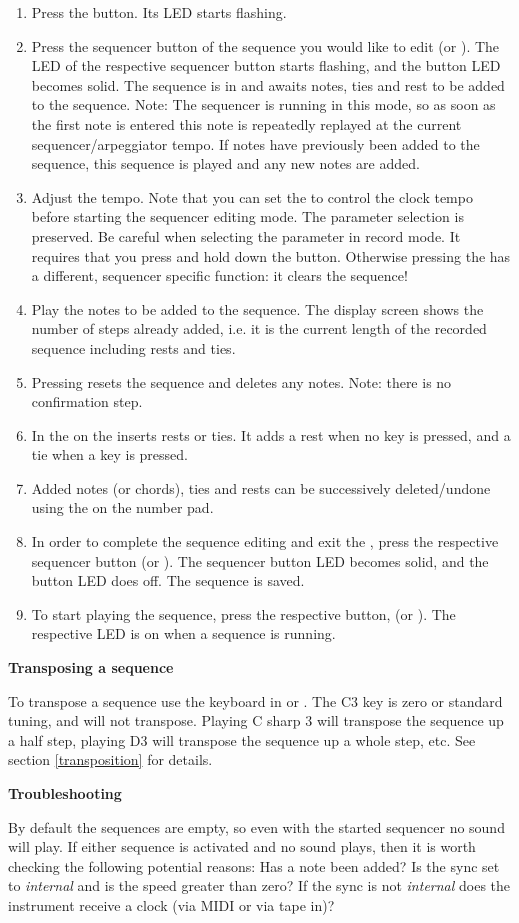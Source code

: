 \begin{enumerate}
  \item Press the \record button. Its LED starts flashing.
  \item Press the sequencer button of the sequence you would like to edit (\seqone or \seqtwo). The LED of the respective sequencer button starts flashing, and the \record button LED becomes solid. The sequence is in \seqedit and awaits notes, ties and rest to be added to the sequence. Note: The sequencer is running in this mode, so as soon as the first note is entered this note is repeatedly replayed at the current sequencer/arpeggiator tempo. If notes have previously been added to the sequence, this sequence is played and any new notes are added. 
  \item Adjust the tempo. Note that you can set the \datadial to control the clock tempo before starting the sequencer editing mode. The parameter selection is preserved. Be careful when selecting the parameter in record mode. It requires that you press and hold down the \totape button. Otherwise pressing the  has a different, sequencer specific function: it clears the sequence!  
  \item Play the notes to be added to the sequence. The display screen shows the number of steps already added, i.e. it is the current length of the recorded sequence including rests and ties.
  \item Pressing  resets the sequence and deletes any notes. Note: there is no confirmation step. 
  \item In \seqedit the  on the \termnumberpad inserts rests or ties. It adds a rest when no key is pressed, and a tie when a key is pressed.
  \item Added notes (or chords), ties and rests can be successively deleted/undone using the  on the number pad. 
  \item In order to complete the sequence editing and exit the \seqedit, press the respective sequencer button (\seqone or \seqtwo). The sequencer button LED becomes solid, and the \record button LED does off. The sequence is saved. 
  \item To start playing the sequence, press the respective button, (\seqone or \seqtwo). The respective LED is on when a sequence is running.
\end{enumerate}

\textbf{Transposing a  sequence}

To transpose a sequence use the keyboard in \shiftmode or \shiftlock. The C3 key is zero or standard tuning, and will not transpose. Playing C sharp 3 will transpose the sequence up a half step, playing D3 will transpose the sequence up a whole step, etc. See section \ref{transposition} for details.

\textbf{Troubleshooting}

By default the sequences are empty, so even with the started sequencer no sound will play. If either sequence is activated and no sound plays, then it is worth checking the following potential reasons: Has a note been added? Is the sync set to \textit{internal} and is the speed greater than zero? If the sync is not \textit{internal} does the instrument receive a clock (via MIDI or via tape in)? 
